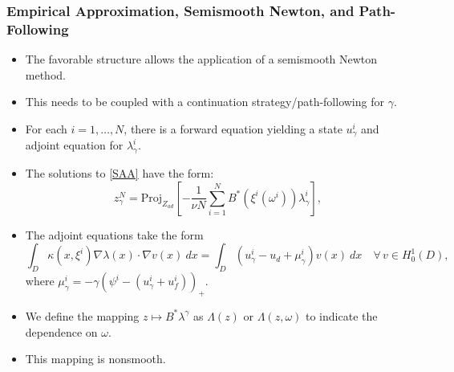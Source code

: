 \documentclass[aspectratio=169,xcolor=dvipsnames,11pt]{beamer}
\newcommand{\dd}{\:d}
\newcommand{\dif}{\dd}
\begin{document}
\begin{footnotesize}
\begin{frame}\frametitle{Empirical Approximation, Semismooth Newton, and Path-Following}
\vspace{-2ex}
\begin{block}{}
\begin{itemize}
\item The favorable structure allows the application of a \alert{semismooth Newton method}.
\item This needs to be coupled with a \alert{continuation strategy/path-following} for $\gamma$.\pause
\item For each $i=1,\dots, N$, there is a forward equation yielding a state $u_{\gamma}^i$ and adjoint equation for $\lambda_{\gamma}^i$.
\item The solutions to \eqref{SAA} have the form:
\begin{equation*}%
z^{N}_{\gamma} = \mathrm{Proj}_{Z_{ad}}\left[-\frac{1}{\nu N} \sum_{i=1}^N B^*(\xi^i(\omega^i)) \lambda^{i}_{\gamma} \right],
\end{equation*}
\item \pause The adjoint equations take the form
  \[
  \int_{D} \kappa(x,\xi^i)\nabla \lambda(x) \cdot \nabla v(x) \dif x  = \int_{D}(u_{\gamma}^i - u_d + \mu_{\gamma}^i) v(x)  \dif x
    \quad\forall\,v\in H_0^1(D),
    \]
    where 
$
\mu_\gamma^{i} = -\gamma  (\psi^i - ({u}_{\gamma}^i + u_f^i))_+.
$
\item \pause We define the mapping $z \mapsto B^* \lambda^{\gamma}$ as $\Lambda(z)$ or $\Lambda(z,\omega)$ to indicate the dependence on $\omega$. 
\item This mapping is \alert{nonsmooth}.
\end{itemize}
\end{block}
\end{frame}


\end{footnotesize}
\end{document}
